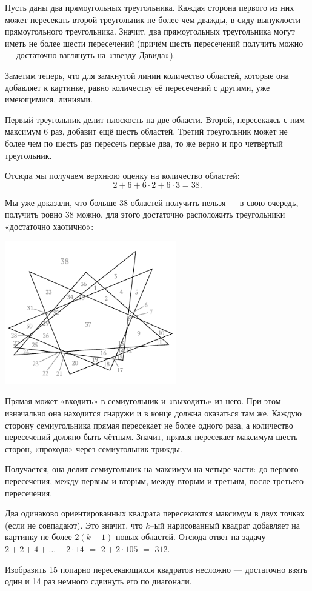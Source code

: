 \begin{itemize}

\itA Пусть даны два прямоугольных треугольника. Каждая сторона первого из них может пересекать второй треугольник не более чем дважды, в сиду выпуклости прямоугольного треугольника. Значит, два прямоугольных треугольника могут иметь не более шести пересечений (причём шесть пересечений получить можно — достаточно взглянуть на «звезду Давида»).

Заметим теперь, что для замкнутой линии количество областей, которые она добавляет к картинке, равно количеству её пересечений с другими, уже имеющимися, линиями.

Первый треугольник делит плоскость на две области. Второй, пересекаясь с ним максимум 6 раз, добавит ещё шесть областей. Третий треугольник может не более чем по шесть раз пересечь первые два, то же верно и про четвёртый треугольник.

Отсюда мы получаем верхнюю оценку на количество областей:
$$2 + 6 + 6 \cdot 2 + 6 \cdot 3 = 38.$$

Мы уже доказали, что больше 38 областей получить нельзя — в свою очередь, получить ровно 38 можно, для этого достаточно расположить треугольники «достаточно хаотично»:

\begin{center}
	\includegraphics[width=7.5cm]{figures/2017-5-1a}
\end{center}

\itB Прямая может «входить» в семиугольник и «выходить» из него. При этом изначально она находится снаружи и в конце должна оказаться там же. Каждую сторону семиугольника прямая пересекает не более одного раза, а количество пересечений должно быть чётным. Значит, прямая пересекает максимум шесть сторон, «проходя» через семиугольник трижды.

Получается, она делит семиугольник на максимум на четыре части: до первого пересечения, между первым и вторым, между вторым и третьим, после третьего пересечения.

\itC Два одинаково ориентированных квадрата пересекаются максимум в двух точках (если не совпадают). Это значит, что $k$--ый нарисованный квадрат добавляет на картинку не более $2(k-1)$ новых областей. Отсюда ответ на задачу — $2+2+4+\ldots+2\cdot 14$ $=$ $2+2\cdot105$ $=$ $312$.

Изобразить 15 попарно пересекающихся квадратов несложно — достаточно взять один и 14 раз немного сдвинуть его по диагонали.
\end{itemize}